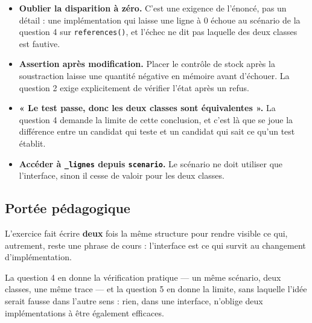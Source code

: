 \begin{itemize}
  \item \textbf{Oublier la disparition à zéro.} C'est une exigence de l'énoncé,
    pas un détail : une implémentation qui laisse une ligne à $0$ échoue au
    scénario de la question 4 sur \lstinline{references()}, et l'échec ne dit
    pas laquelle des deux classes est fautive.
  \item \textbf{Assertion après modification.} Placer le contrôle de stock après
    la soustraction laisse une quantité négative en mémoire avant d'échouer. La
    question 2 exige explicitement de vérifier l'état après un refus.
  \item \textbf{« Le test passe, donc les deux classes sont équivalentes ».} La
    question 4 demande la limite de cette conclusion, et c'est là que se joue la
    différence entre un candidat qui teste et un candidat qui sait ce qu'un test
    établit.
  \item \textbf{Accéder à \lstinline{_lignes} depuis \lstinline{scenario}.} Le
    scénario ne doit utiliser que l'interface, sinon il cesse de valoir pour les
    deux classes.
\end{itemize}

\subsection*{Portée pédagogique}

L'exercice fait écrire \textbf{deux} fois la même structure pour rendre visible
ce qui, autrement, reste une phrase de cours : l'interface est ce qui survit au
changement d'implémentation.

La question 4 en donne la vérification pratique — un même scénario, deux
classes, une même trace — et la question 5 en donne la limite, sans laquelle
l'idée serait fausse dans l'autre sens : rien, dans une interface, n'oblige
deux implémentations à être également efficaces.
